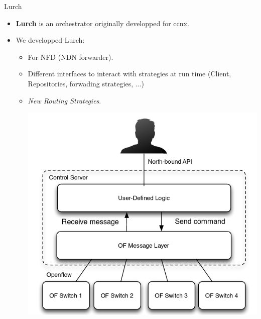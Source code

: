 \documentclass[8pt]{beamer}
\newcommand{\1}{\mathbbm 1}
\begin{document}
\begin{frame}{Lurch}

\begin{itemize}
\item \textbf{Lurch} is an orchestrator originally developped for ccnx. 
\item We developped Lurch:

\begin{itemize}
\item For NFD (NDN forwarder).
\item Different interfaces to interact with strategies at run time (Client, Repositories, forwading strategies, ...)
\item \textit{New Routing Strategies}.



\begin{center}
\includegraphics[scale=0.25]{figures/controller.png}
\end{center}


\end{itemize}
\end{itemize} 




\end{frame}
\end{document}
